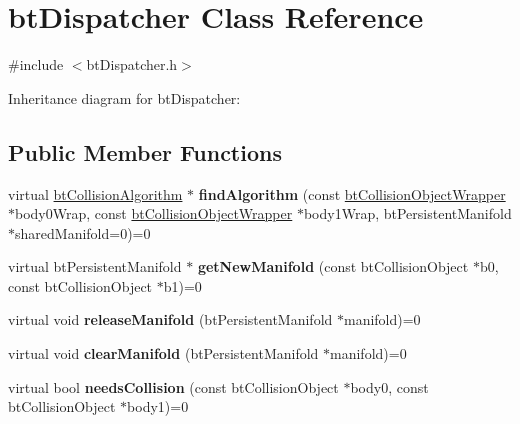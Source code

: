 \hypertarget{classbt_dispatcher}{\section{bt\+Dispatcher Class Reference}
\label{classbt_dispatcher}
}


{\ttfamily \#include $<$bt\+Dispatcher.\+h$>$}



Inheritance diagram for bt\+Dispatcher\+:
\subsection*{Public Member Functions}
\begin{DoxyCompactItemize}
\item 
\hypertarget{classbt_dispatcher_a9214731648f5b2d5d55192b5bf649cf9}{virtual \hyperlink{classbt_collision_algorithm}{bt\+Collision\+Algorithm} $\ast$ {\bfseries find\+Algorithm} (const \hyperlink{structbt_collision_object_wrapper}{bt\+Collision\+Object\+Wrapper} $\ast$body0\+Wrap, const \hyperlink{structbt_collision_object_wrapper}{bt\+Collision\+Object\+Wrapper} $\ast$body1\+Wrap, bt\+Persistent\+Manifold $\ast$shared\+Manifold=0)=0}\label{classbt_dispatcher_a9214731648f5b2d5d55192b5bf649cf9}

\item 
\hypertarget{classbt_dispatcher_a8c7798c84a4ec8da239b70797fa5abf2}{virtual bt\+Persistent\+Manifold $\ast$ {\bfseries get\+New\+Manifold} (const bt\+Collision\+Object $\ast$b0, const bt\+Collision\+Object $\ast$b1)=0}\label{classbt_dispatcher_a8c7798c84a4ec8da239b70797fa5abf2}

\item 
\hypertarget{classbt_dispatcher_a6bfc10aa51f95d8e536e68fc46607d83}{virtual void {\bfseries release\+Manifold} (bt\+Persistent\+Manifold $\ast$manifold)=0}\label{classbt_dispatcher_a6bfc10aa51f95d8e536e68fc46607d83}

\item 
\hypertarget{classbt_dispatcher_a2d07cb876691cd466dc3228074c794b4}{virtual void {\bfseries clear\+Manifold} (bt\+Persistent\+Manifold $\ast$manifold)=0}\label{classbt_dispatcher_a2d07cb876691cd466dc3228074c794b4}

\item 
\hypertarget{classbt_dispatcher_a9a470a0e86347332ab6f1060a9e07362}{virtual bool {\bfseries needs\+Collision} (const bt\+Collision\+Object $\ast$body0, const bt\+Collision\+Object $\ast$body1)=0}\label{classbt_dispatcher_a9a470a0e86347332ab6f1060a9e07362}


\end{DoxyCompactItemize}
